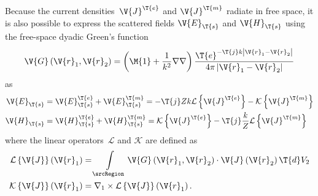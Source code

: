 \documentclass[journal]{IEEEtran}
\providecommand{\Je}{\V{J}^\T{e}} %
\providecommand{\Jm}{\V{J}^\T{m}} %
\providecommand{\Ee}{\V{E}^\T{e}} %
\providecommand{\Em}{\V{E}^\T{m}} %
\providecommand{\He}{\V{H}^\T{e}} %
\providecommand{\Hm}{\V{H}^\T{m}} %
\begin{document}
Because the current densities~$\Je$ and $\Jm$ radiate in free space, it is also possible to express the scattered fields $\V{E}_\T{s}$ and $\V{H}_\T{s}$ using the free-space dyadic Green's function~\cite{Zangwill_Modern_Electrodynamics}
\begin{equation}
    \V{G} \left(\V{r}_1, \V{r}_2 \right) = \left( \M{1} + \dfrac{1}{k^2} \nabla \nabla \right) \dfrac{\T{e}^{ - \T{j} k \left| \V{r}_1 - \V{r}_2 \right|} }{4\pi \left| \V{r}_1 - \V{r}_2 \right|}
\end{equation}
as
\begin{equation}
\begin{aligned}
\label{eq:EHviaGreen}
    \V{E}_\T{s} &= \Ee_\T{s} + \Em_\T{s}  = - \T{j} Z k \mathcal{L} \left\{ \Je \right\}  -   \mathcal{K} \left\{ \Jm \right\}  \\
    \V{H}_\T{s} &= \He_\T{s} + \Hm_\T{s} =  \mathcal{K} \left\{ \Je \right\}  - \T{j} \dfrac{k}{Z} \mathcal{L} \left\{ \Jm \right\}
\end{aligned}
\end{equation}
where the linear operators~$\mathcal{L}$ and $\mathcal{K}$ are defined as
\begin{equation}
\begin{aligned}
\label{eq:LK}
    \mathcal{L} \left\{ \V{J} \right\} \left( \V{r}_1 \right) &= \int \limits_{\srcRegion} \V{G} \left(\V{r}_1, \V{r}_2 \right) \cdot \V{J} \left( \V{r}_2 \right) \T{d}V_2 \\
    \mathcal{K} \left\{ \V{J} \right\} \left( \V{r}_1 \right) &= \nabla_1 \times \mathcal{L} \left\{ \V{J} \right\} \left( \V{r}_1 \right).
\end{aligned}
\end{equation}
\end{document}
